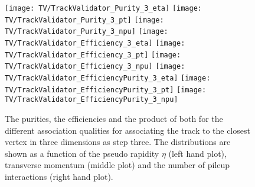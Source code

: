\begin{figure}[h!b]
    \centering
    \texttt{[image: TV/TrackValidator\_Purity\_3\_eta]}
    \texttt{[image: TV/TrackValidator\_Purity\_3\_pt]}
    \texttt{[image: TV/TrackValidator\_Purity\_3\_npu]}
    \newline
    \texttt{[image: TV/TrackValidator\_Efficiency\_3\_eta]}
    \texttt{[image: TV/TrackValidator\_Efficiency\_3\_pt]}
    \texttt{[image: TV/TrackValidator\_Efficiency\_3\_npu]}
    \newline
    \texttt{[image: TV/TrackValidator\_EfficiencyPurity\_3\_eta]}
    \texttt{[image: TV/TrackValidator\_EfficiencyPurity\_3\_pt]}
    \texttt{[image: TV/TrackValidator\_EfficiencyPurity\_3\_npu]}
    \caption[Purities, efficiencies and their product for for the different quality of the association map with associating to the closest vertex in three dimensions as third step]{The purities, the efficiencies and the product of both for the different association qualities for associating the track to the closest vertex in three dimensions as step three. The distributions are shown as a function of the pseudo rapidity $\eta$ (left hand plot), transverse momentum (middle plot) and the number of pileup interactions (right hand plot). \label{plot:TASEFRDQ3Signal}}
\end{figure}

